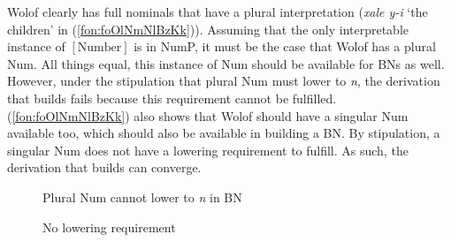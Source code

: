 \documentclass[output=paper]{langscibook}
\begin{document}
Wolof clearly has full nominals that have a plural interpretation (\textit{xale y-i} `the children' in (\ref{fon:foOlNmNlBzKk})). Assuming that the only interpretable instance of $[\mbox{Number}]$ is in NumP, it must be the case that Wolof has a plural Num. All things equal, this instance of Num should be available for BNs as well. However, under the stipulation that plural Num must lower to \textit{n}, the derivation that builds  fails because this requirement cannot be fulfilled. (\ref{fon:foOlNmNlBzKk}) also shows that Wolof should have a singular Num available too, which should also be available in building a BN. By stipulation, a singular Num does not have a lowering requirement to fulfill. As such, the derivation that builds  can converge.

\begin{figure}
\begin{floatrow}
\captionsetup{margin=.05\linewidth}
{\caption{Plural Num cannot lower to \textit{n} in BN\label{fon:dErIvVBnSgPl1}}}%
{\caption{No lowering requirement\label{fon:dErIvVBnSgPl2}}}
\end{floatrow}
\end{figure}
\end{document}
